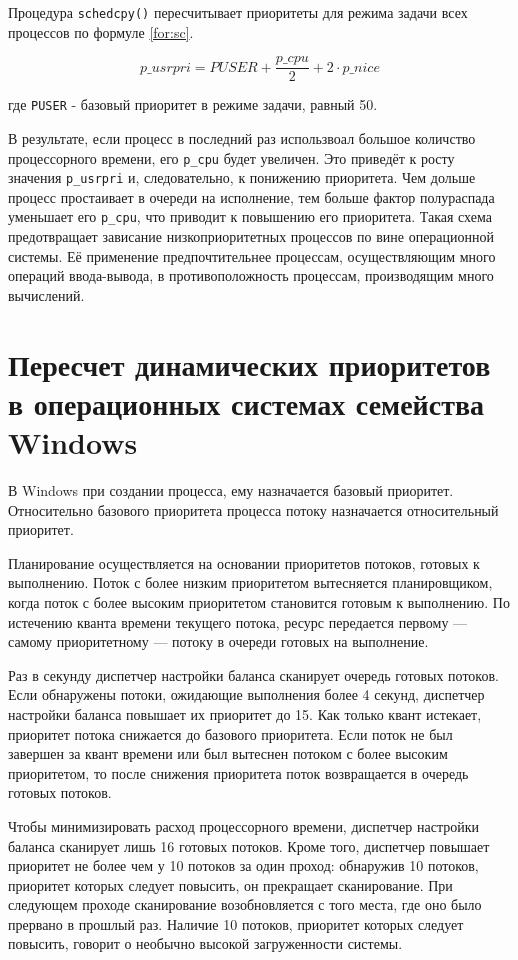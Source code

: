 \documentclass[a4paper,12pt]{bmstu}
\begin{document}
Процедура \texttt{schedcpy()} пересчитывает приоритеты для режима задачи всех процессов по формуле \eqref{for:sc}.

\begin{equation}
    \label{for:sc}
    p\_usrpri = PUSER + \frac{p\_cpu}{2} + 2 \cdot p\_nice
\end{equation}

где \texttt{PUSER} - базовый приоритет в режиме задачи, равный 50.

В результате, если процесс в последний раз использвоал большое количство процессорного времени, его \texttt{p\_cpu} будет увеличен. Это приведёт к росту значения \texttt{p\_usrpri} и, следовательно, к понижению приоритета. Чем дольше процесс простаивает в очереди на исполнение, тем больше фактор полураспада уменьшает его \texttt{p\_cpu}, что приводит к повышению его приоритета. Такая схема предотвращает зависание низкоприоритетных процессов по вине операционной системы. Её применение предпочтительнее процессам, осуществляющим много операций ввода-вывода, в противоположность процессам, производящим много вычислений.



\section{Пересчет динамических приоритетов в операционных системах семейства Windows}

В Windows при создании процесса, ему назначается базовый приоритет. Относительно базового приоритета процесса потоку назначается относительный приоритет.

Планирование осуществляется на основании приоритетов потоков, готовых к выполнению. Поток с более низким приоритетом вытесняется планировщиком, когда поток с более высоким приоритетом становится готовым к выполнению. По истечению кванта времени текущего потока, ресурс передается первому --- самому приоритетному --- потоку в очереди готовых на выполнение.

Раз в секунду диспетчер настройки баланса сканирует очередь готовых потоков. Если обнаружены потоки, ожидающие выполнения более 4 секунд, диспетчер настройки баланса повышает их приоритет до 15. Как только квант истекает, приоритет потока снижается до базового приоритета. Если поток не был завершен за квант времени или был вытеснен потоком с более высоким приоритетом, то после снижения приоритета поток возвращается в очередь готовых потоков.

Чтобы минимизировать расход процессорного времени, диспетчер настройки баланса сканирует лишь 16 готовых потоков. Кроме того, диспетчер повышает приоритет не более чем у 10 потоков за один проход: обнаружив 10 потоков, приоритет которых следует повысить, он прекращает сканирование. При следующем проходе сканирование возобновляется с того места, где оно было прервано в прошлый раз. Наличие 10 потоков, приоритет которых следует повысить, говорит о необычно высокой загруженности системы.
\end{document}

